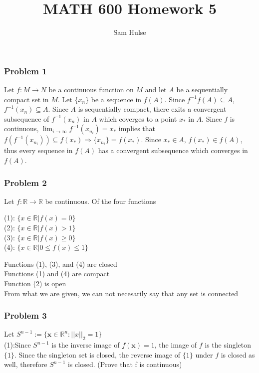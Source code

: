 \documentclass[10pt,a4paper]{article}
\title{MATH 600 Homework 5}
\author{Sam Hulse}
\newcommand{\R}{\mathbb{R}}
\begin{document}
\maketitle

\subsubsection{Problem 1}
Let $f: M \rightarrow N$ be a continuous function on $M$ and let $A$ be a sequentially compact set in $M$. Let $\{x_n\}$ be a sequence in $f(A)$. Since $f^{-1}f(A) \subseteq A$, $f^{-1}(x_n) \subseteq A$. Since $A$ is sequentially compact, there exits a convergent subsequence of $f^{-1}(x_n)$ in $A$ which coverges to a point $x_*$ in $A$. Since $f$ is continuous, $\lim_{i\to\infty} f^{-1}(x_{n_i}) = x_*$ implies that $f(f^{-1}(x_{n_i})) \subseteq f(x_*) \Rightarrow \{x_{n_i}\} = f(x_*)$. Since $x_* \in A$, $f(x_*) \in f(A)$, thus every sequence in $f(A)$ has a convergent subsequence which converges in $f(A)$.

\subsubsection{Problem 2}
Let $f: \R \rightarrow \R$ be continuous. Of the four functions\\
\begin{center}
(1): $\{x \in \R | f(x) = 0\}$\\
(2): $\{x \in \R | f(x) > 1\}$\\
(3): $\{x \in \R | f(x) \geq 0\}$\\
(4): $\{x \in \R | 0 \leq f(x) \leq 1\}$\\ 
\end{center}

\noindent Functions (1), (3), and (4) are closed\\
Functions (1) and (4) are compact\\
Function (2) is open\\
From what we are given, we can not necesarily say that any set is connected\\

\subsubsection{Problem 3}
Let $S^{n-1} := \{\mathbf{x} \in \R^n: ||x||_2 = 1\}$\\

(1):Since $S^{n-1}$ is the inverse image of $f(\mathbf{x}) = 1$, the image of $f$ is the singleton $\{1\}$. Since the singleton set is closed, the reverse image of $\{1\}$ under $f$ is closed as well, therefore $S^{n-1}$ is closed. (Prove that f is continuous)\\
\end{document}
